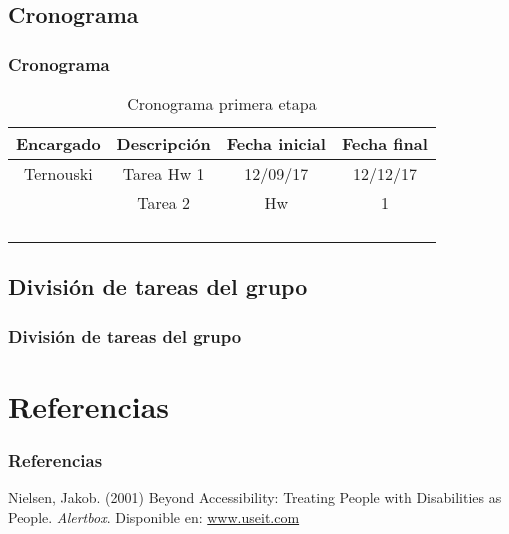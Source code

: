 \subsection{Cronograma}
\begin{frame}
	\frametitle{Cronograma}
	\begin{table}[]
		\centering
		\caption{Cronograma primera etapa}
		\begin{tabular}{cccc}
			Encargado & Descripción   & Fecha inicial & Fecha final \\ \hline
			Ternouski & Tarea Hw 1    & 12/09/17      & 12/12/17    \\
					  & Tarea  2      & Hw            & 1           \\
					  &               &               &             \\
					  &               &               &             \\
					  &               &               &             \\
					  &               &               &             \\ \hline
		\end{tabular}
	\end{table}
\end{frame}

\subsection{División de tareas del grupo}
\begin{frame}
	\frametitle{División de tareas del grupo}

\end{frame}

\section{Referencias}

\begin{frame}
	\frametitle{Referencias}
	\footnotesize{
	\begin{thebibliography}{99}
		 Nielsen, Jakob. (2001)
		\newblock Beyond Accessibility: Treating People with Disabilities as People.
		\newblock \emph{Alertbox}.
		Disponible en:
		\href{http://www.useit.com/alertbox/20011111.html}{www.useit.com}
	\end{thebibliography}
	}
\end{frame}
